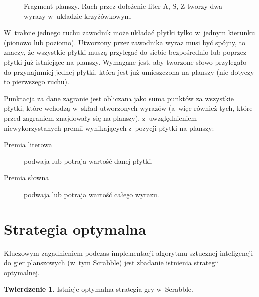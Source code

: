 \documentclass[a4paper,twocolumn,11pt]{article}
\theoremstyle{definition}
\newtheorem{theorem}{Twierdzenie}
\begin{document}
\begin{figure}[ht!]
\begin{center}
		\caption{Fragment planszy. Ruch przez dołożenie liter A, S, Z tworzy dwa wyrazy w~układzie krzyżówkowym.}
		\label{fig:crossword_second}
	\end{center}
\end{figure}

W~trakcie jednego ruchu zawodnik może układać płytki tylko w~jednym kierunku (pionowo lub poziomo). Utworzony przez zawodnika wyraz musi być spójny, to znaczy, że wszystkie płytki muszą przylegać do siebie bezpośrednio lub poprzez płytki już istniejące na planszy. Wymagane jest, aby tworzone słowo przylegało do przynajmniej jednej płytki, która jest już umieszczona na planszy (nie dotyczy to pierwszego ruchu).

Punktacja za dane zagranie jest obliczana jako suma punktów za wszystkie płytki, które wchodzą w~skład utworzonych wyrazów (a~więc również tych, które przed zagraniem znajdowały się na planszy), z~uwzględnieniem niewykorzystanych premii wynikających z~pozycji płytki na planszy:

\begin{description}
 \item [Premia literowa] podwaja lub potraja wartość danej płytki.
 \item [Premia słowna] podwaja lub potraja wartość całego wyrazu.
\end{description}

\section{Strategia optymalna}

Kluczowym zagadnieniem podczas implementacji algorytmu sztucznej inteligencji do gier planszowych (w~tym Scrabble) jest zbadanie istnienia strategii optymalnej.

\begin{theorem}
	Istnieje optymalna strategia gry w~Scrabble.
	\label{thm:optimal_strategy_existence}
\end{theorem}
\end{document}
